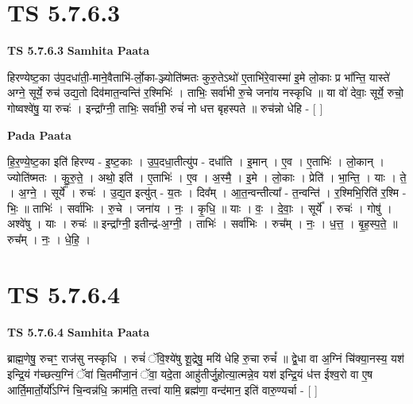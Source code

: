 \documentclass[17pt]{extarticle}
\begin{document}
\section*{ TS 5.7.6.3 }

\textbf{TS 5.7.6.3 } \newline
\textbf{Samhita Paata} \newline

हिरण्येष्ट॒का उ॑प॒दधा॑ती॒-माने॒वैताभि॑-र्लो॒का-ञ्ज्योति॑ष्मतः कुरु॒तेऽथो॑ ए॒ताभि॑रे॒वास्मा॑ इ॒मे लो॒काः प्र भा᳚न्ति॒ यास्ते॑ अग्ने॒ सूर्ये॒ रुच॑ उद्य॒तो दिव॑मात॒न्वन्ति॑ र॒श्मिभिः॑ । ताभिः॒ सर्वा॑भी रु॒चे जना॑य नस्कृधि ॥ या वो॑ देवाः॒ सूर्ये॒ रुचो॒ गोष्वश्वे॑षु॒ या रुचः॑ । इन्द्रा᳚ग्नी॒ ताभिः॒ सर्वा॑भी॒ रुचं॑ नो धत्त बृहस्पते ॥ रुच॑न्नो धेहि - [  ] \newline

\textbf{Pada Paata} \newline

हि॒र॒ण्ये॒ष्ट॒का इति॑ हिरण्य - इ॒ष्ट॒काः । उ॒प॒दधा॒तीत्यु॑प - दधा॑ति । इ॒मान् । ए॒व । ए॒ताभिः॑ । लो॒कान् । ज्योति॑ष्मतः । कु॒रु॒ते॒ । अथो॒ इति॑ । ए॒ताभिः॑ । ए॒व । अ॒स्मै॒ । इ॒मे । लो॒काः । प्रेति॑ । भा॒न्ति॒ । याः । ते॒ । अ॒ग्ने॒ । सूर्ये᳚ । रुचः॑ । उ॒द्य॒त इत्यु॑त् - य॒तः । दिव᳚म् । आ॒त॒न्वन्तीत्या᳚ - त॒न्वन्ति॑ । र॒श्मिभि॒रिति॑ र॒श्मि - भिः॒ ॥ ताभिः॑ । सर्वा॑भिः । रु॒चे । जना॑य । नः॒ । कृ॒धि॒ ॥ याः । वः॒ । दे॒वाः॒ । सूर्ये᳚ । रुचः॑ । गोषु॑ । अश्वे॑षु । याः । रुचः॑ ॥ इन्द्रा᳚ग्नी॒ इतीन्द्र॑-अ॒ग्नी॒ । ताभिः॑ । सर्वा॑भिः । रुच᳚म् । नः॒ । ध॒त्त॒ । बृ॒ह॒स्प॒ते॒ ॥ रुच᳚म् । नः॒ । धे॒हि॒ ।  \newline




\section*{ TS 5.7.6.4 }

\textbf{TS 5.7.6.4 } \newline
\textbf{Samhita Paata} \newline

ब्राह्म॒णेषु॒ रुचꣳ॒॒ राज॑सु नस्कृधि । रुचं॑ ॅवि॒श्ये॑षु शू॒द्रेषु॒ मयि॑ धेहि रु॒चा रुचं᳚ ॥ द्वे॒धा वा अ॒ग्निं चि॑क्या॒नस्य॒ यश॑ इन्द्रि॒यं ग॑च्छत्य॒ग्निं ॅवा॑ चि॒तमी॑जा॒नं ॅवा॒ यदे॒ता आहु॑तीर्जु॒होत्या॒त्मन्ने॒व यश॑ इन्द्रि॒यं ध॑त्त ईश्व॒रो वा ए॒ष आर्ति॒मार्तो॒र्यो᳚ऽग्निं चि॒न्वन्न॑धि॒ क्राम॑ति॒ तत्त्वा॑ यामि॒ ब्रह्म॑णा॒ वन्द॑मान॒ इति॑ वारु॒ण्यर्चा - [  ] \newline
\end{document}

